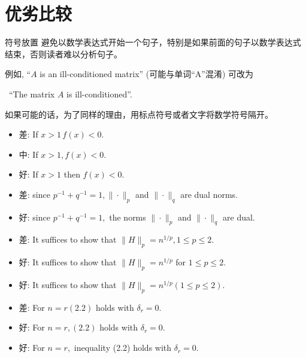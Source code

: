 \documentclass[fontset=mac]{ctexbeamer}
\begin{document}
\section{优劣比较}

\begin{frame}{符号放置}
	避免以数学表达式开始一个句子，特别是如果前面的句子以数学表达式结束，否则读者难以分析句子。
	
	例如, ``$A$ is  an ill-conditioned matrix'' 
	(可能与单词``A''混淆)	
	可改为\pause
	
	 \qquad 	 \ ``The matrix $A$ is   ill-conditioned''. 
\vspace{10pt}

如果可能的话，为了同样的理由，用标点符号或者文字将数学符号隔开。

	\begin{itemize}
\item 差: If $x>1 \, f(x)<0$.\pause

\item 中: If $x>1, f(x)<0$. \pause

\item  好: If $x>1$ then $f(x)<0$.
	\end{itemize}

\vspace{10pt}

	\begin{itemize}
	\item 
差: since $p^{-1}+q^{-1}=1,\|\cdot\|_{p}$ and $\|\cdot\|_{q}$ are dual norms. \pause

\item  好: since $p^{-1}+q^{-1}=1,$ the norms $\|\cdot\|_{p}$ and $\|\cdot\|_{q}$ are dual.
	\end{itemize}
\vspace{10pt}
\end{frame}

\begin{frame}
	\begin{itemize}
	\item 
差: It suffices to show that $\|H\|_{p}=n^{1 / p}, 1 \leqslant p \leqslant 2$. \pause
	\item 
好: It suffices to show that $\|H\|_{p}=n^{1 / p}$ for $1 \leqslant p \leqslant 2$. 
\item  
好: It suffices to show that $\|H\|_{p}=n^{1 / p}(1 \leqslant p \leqslant 2)$.
	\end{itemize}
\vspace{10pt}

\begin{itemize}
	\item 
差: For $n=r(2.2)$ holds with $\delta_{r}=0$. \pause
\item 
好: For $n=r,(2.2)$ holds with $\delta_{r}=0 .$ 
\item 
好: For $n=r,$ inequality (2.2) holds with $\delta_{r}=0$.
	\end{itemize}

\end{frame}
\end{document}

